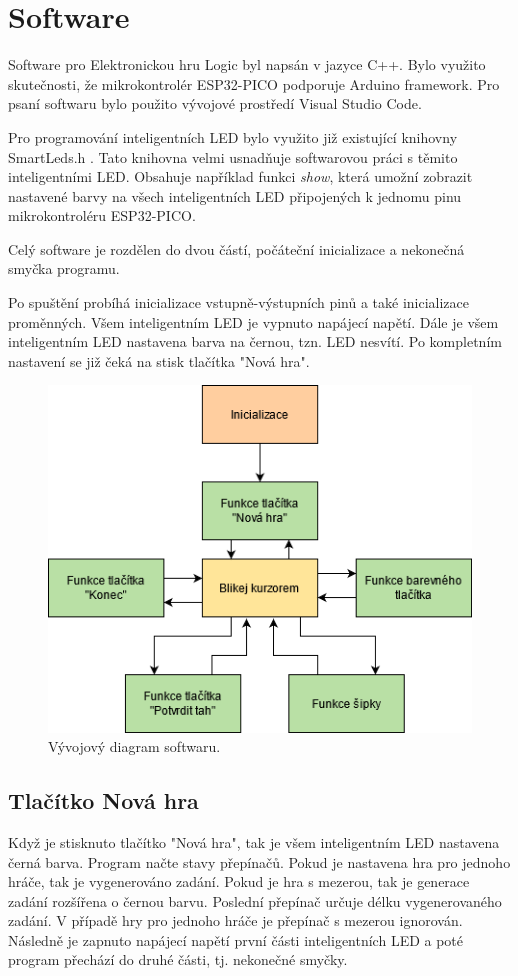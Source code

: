 \chapter{Software}
Software pro Elektronickou hru Logic byl napsán v jazyce C++. Bylo využito skutečnosti, že mikrokontrolér ESP32-PICO podporuje Arduino 
framework. Pro psaní softwaru bylo použito vývojové prostředí Visual Studio Code. %

Pro programování inteligentních LED bylo využito již existující knihovny SmartLeds.h \cite{SmartLeds}.
Tato knihovna velmi usnadňuje softwarovou práci s těmito inteligentními LED. Obsahuje například funkci {\it show}, která umožní zobrazit 
nastavené barvy na všech inteligentních LED připojených k jednomu pinu mikrokontroléru ESP32-PICO. 

Celý software je rozdělen do dvou částí, počáteční inicializace a nekonečná smyčka programu. 

Po spuštění probíhá inicializace vstupně-výstupních pinů a také inicializace proměnných. Všem inteligentním LED je vypnuto napájecí napětí. 
Dále je všem inteligentním LED nastavena barva na černou, tzn. LED nesvítí. Po kompletním nastavení se již čeká na stisk tlačítka "Nová hra". 

\begin{figure}[!h]
    \begin{center}
      \includegraphics[scale=0.5]{obrazky/Celek.png}
    \end{center}
    \caption[Vývojový diagram softwaru]{Vývojový diagram softwaru.}
  \end{figure}

\section{Tlačítko Nová hra}
Když je stisknuto tlačítko "Nová hra", tak je všem inteligentním LED nastavena černá barva. Program načte stavy přepínačů. Pokud je nastavena hra pro 
jednoho hráče, tak je vygenerováno zadání. Pokud je hra s mezerou, tak je generace zadání rozšířena o černou barvu. Poslední přepínač určuje délku 
vygenerovaného zadání. V případě hry pro jednoho hráče je přepínač s mezerou ignorován. Následně je zapnuto napájecí napětí 
první části inteligentních LED a poté program přechází do druhé části, tj. nekonečné smyčky.

